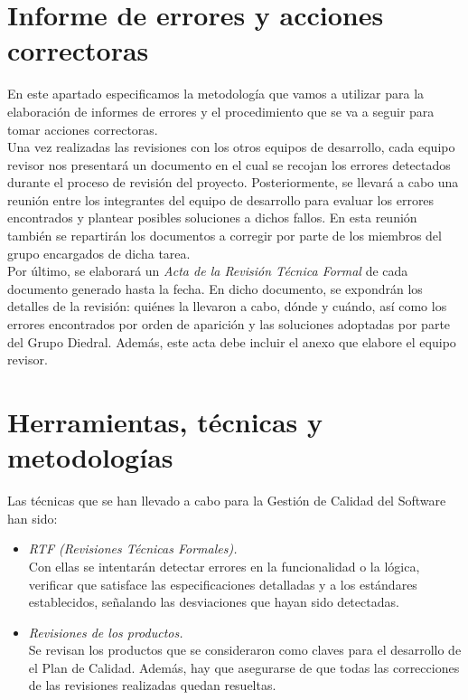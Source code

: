 \documentclass[11pt, a4paper, twoside, titlepage]{article}
\begin{document}
	\section{Informe de errores y acciones correctoras} %
		En este apartado especificamos la metodología que vamos a utilizar para la elaboración de informes de errores y el procedimiento que se va a seguir para tomar acciones correctoras. \\

		Una vez realizadas las revisiones con los otros equipos de desarrollo, cada equipo revisor nos presentará un documento en el cual se recojan los errores detectados durante el proceso de revisión del proyecto. Posteriormente, se llevará a cabo una reunión entre los integrantes del equipo de desarrollo para evaluar los errores encontrados y plantear posibles soluciones a dichos fallos. En esta reunión también se repartirán los documentos a corregir por parte de los miembros del grupo encargados de dicha tarea. \\

		Por último, se elaborará un \textit{Acta de la Revisión Técnica Formal} de cada documento generado hasta la fecha. En dicho documento, se expondrán los detalles de la revisión: quiénes la llevaron a cabo, dónde y cuándo, así como los errores encontrados por orden de aparición %
 y las soluciones adoptadas por parte del Grupo Diedral. Además, este acta debe incluir el anexo que elabore el equipo revisor.
	
	\section{Herramientas, técnicas y metodologías} %
		Las técnicas que se han llevado a cabo para la Gestión de Calidad del Software han sido:

		\begin{itemize}
			\item \textit{RTF (Revisiones Técnicas Formales).} \\
				Con ellas se intentarán detectar errores en la funcionalidad o la lógica, verificar que satisface las especificaciones detalladas y a los estándares establecidos, señalando las desviaciones que hayan sido detectadas.
			\item \textit{Revisiones de los productos.} \\
				Se revisan los productos que se consideraron como claves para el desarrollo de el Plan de Calidad. Además, hay que asegurarse de que todas las correcciones de las revisiones realizadas quedan resueltas.
		 \end{itemize}
\end{document}
